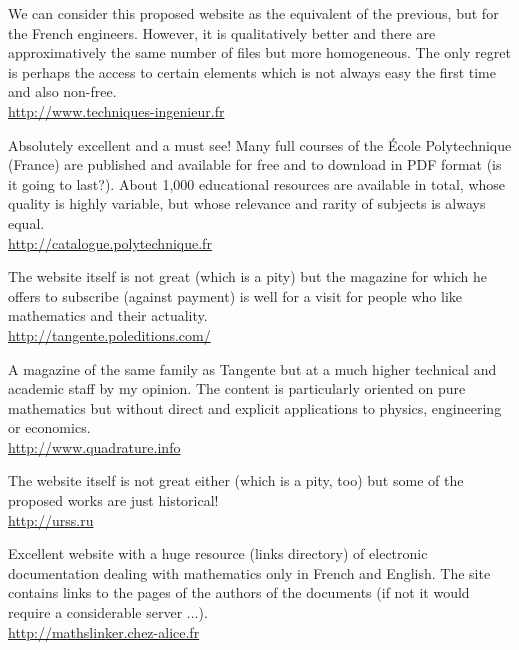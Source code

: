 	{\Large {}}{\Large {}}{\Large {}}{\Large {}}{\Large {}}\bcdfrance{} We can consider this proposed website as the equivalent of the previous, but for the French engineers. However, it is qualitatively better and there are approximatively the same number of files but more homogeneous. The only regret is perhaps the access to certain elements which is not always easy the first time and also non-free.\\
	\href{http://www.techniques-ingenieur.fr}{\color{blue} http://www.techniques-ingenieur.fr}
	
	{\Large {}}{\Large {}}{\Large {}}{\Large {}}\bcdfrance{} Absolutely excellent and a must see! Many full courses of the École Polytechnique (France) are published and available for free and to download in PDF format (is it going to last?). About 1,000 educational resources are available in total, whose quality is highly variable, but whose relevance and rarity of subjects is always equal.\\
	\href{http://catalogue.polytechnique.fr}{\color{blue} http://catalogue.polytechnique.fr}
	
	{\Large {}}{\Large {}}{\Large {}}{\Large {}}\bcdfrance{}  The website itself is not great (which is a pity) but the magazine for which he offers to subscribe (against payment) is well for a visit for people who like mathematics and their actuality.\\
	\href{http://tangente.poleditions.com/}{\color{blue}http://tangente.poleditions.com/}
	
	{\Large {}}{\Large {}}{\Large {}}{\Large {}}\bcdfrance{} A magazine of the same family as Tangente but at a much higher technical and academic staff by my opinion. The content is particularly oriented on pure mathematics but without direct and explicit applications to physics, engineering or economics.\\
	\href{http://www.quadrature.info}{\color{blue}http://www.quadrature.info}
	
	{\Large {}}{\Large {}}{\Large {}}{\Large {}} The website itself is not great either (which is a pity, too) but some of the proposed works are just historical!\\
	\href{http://urss.ru}{\color{blue}http://urss.ru}
	
	{\Large {}}{\Large {}}{\Large {}}{\Large {}}\bcdfrance{} Excellent website with a huge resource (links directory) of electronic documentation dealing with mathematics only in French and English. The site contains links to the pages of the authors of the documents (if not it would require a considerable server ...).\\
	\href{http://mathslinker.chez-alice.fr}{\color{blue}http://mathslinker.chez-alice.fr}
	
